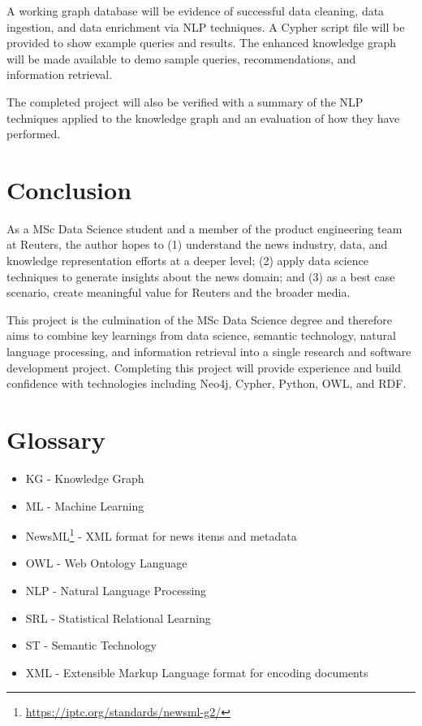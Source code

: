 \documentclass[11pt]{article}
\begin{document}
A working graph database will be evidence of successful data cleaning, data ingestion, and data enrichment via NLP techniques. A Cypher script file will be provided to show example queries and results. The enhanced knowledge graph will be made available to demo sample queries, recommendations, and information retrieval.

The completed project will also be verified with a summary of the NLP techniques applied to the knowledge graph and an evaluation of how they have performed.

\newpage
\section{Conclusion}

As a MSc Data Science student and a member of the product engineering team at Reuters, the author hopes to (1) understand the news industry, data, and knowledge representation efforts at a deeper level; (2) apply data science techniques to generate insights about the news domain; and (3) as a best case scenario, create meaningful value for Reuters and the broader media.

This project is the culmination of the MSc Data Science degree and therefore aims to combine key learnings from data science, semantic technology, natural language processing, and information retrieval into a single research and software development project. Completing this project will provide experience and build confidence with technologies including Neo4j, Cypher, Python, OWL, and RDF.

\newpage
\section{Glossary}
\begin{itemize}
\item KG - Knowledge Graph
\item ML - Machine Learning
\item NewsML\footnote{\url{https://iptc.org/standards/newsml-g2/}} - XML format for news items and metadata
\item OWL - Web Ontology Language
\item NLP - Natural Language Processing
\item SRL - Statistical Relational Learning
\item ST - Semantic Technology
\item XML - Extensible Markup Language format for encoding documents
\end{itemize}

\newpage


\end{document}
